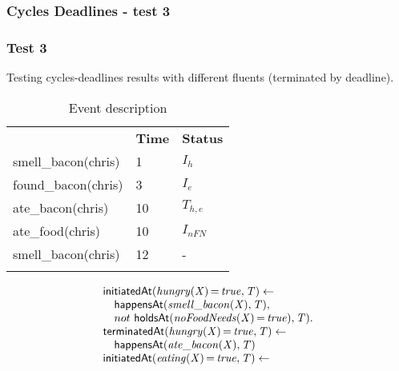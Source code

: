 \documentclass[8pt]{beamer}
\DeclareMathOperator{\val}{=}  %
\def \patsize {}
\def\happensAt{\textsf{\patsize happensAt}}
\def\holdsAt{\textsf{\patsize holdsAt}}
\def\initiatedAt{\textsf{\patsize initiatedAt}}
\def\terminatedAt{\textsf{\patsize terminatedAt}}
\newenvironment{mysplit}%
  {\arraycolsep 0pt \begin{array}{l}}%
  {\end{array}}
\begin{document}
\begin{frame}
    \frametitle{Cycles Deadlines - test 3}
    \subsubsection{Test 3}
    \small
    Testing cycles-deadlines results with different fluents (terminated by deadline).\linebreak
    \begin{minipage}{0.4\linewidth}
        \begin{table}[t!]
            \caption{Event description}
            \begin{center}

                \begin{tabular}{lll}
                    \hline\noalign{\smallskip}
                    \multicolumn{1}{l}{\textbf{Event}} & \multicolumn{1}{c}{\textbf{Time}} & \multicolumn{1}{c}{\textbf{Status}} \\
                    smell\_bacon(chris)& 1 & $I_{h}$\\
                    found\_bacon(chris)& 3 & $I_{e}$\\
                    ate\_bacon(chris)& 10  & $T_{h,e}$\\
                    ate\_food(chris)& 10  & $I_{nFN}$\\
                    smell\_bacon(chris)& 12 & -\\
                    \noalign{\smallskip}
                    \hline
                \end{tabular}
            \end{center}
        \end{table}
    \end{minipage}
    \begin{minipage}{0.55\linewidth}
        \begin{align*}
            \begin{mysplit}
                \initiatedAt\mathit{(hungry(X)\val true,T)\leftarrow}\\
                \quad    \happensAt\mathit{(smell\_bacon(X),T),}\\
                \quad    not\ \holdsAt\mathit{(noFoodNeeds(X)\val true),T).}\\
                \terminatedAt\mathit{(hungry(X)\val true,T)\leftarrow}\\
                \quad    \happensAt\mathit{(ate\_bacon(X),T)}\\
                \initiatedAt\mathit{(eating(X)\val true,T)\leftarrow}\\

\end{mysplit}
\end{align*}
\end{minipage}
\end{frame}
\end{document}
